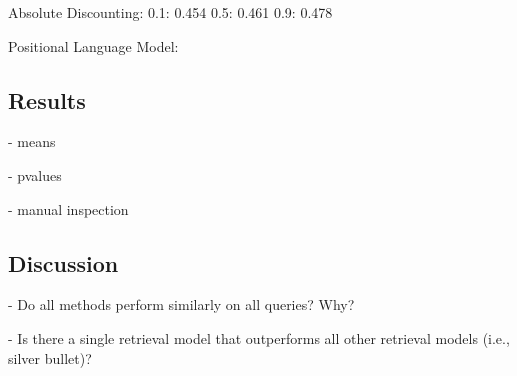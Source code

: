 Absolute Discounting:
0.1: 0.454
0.5: 0.461
0.9: 0.478

Positional Language Model:




\subsection{Results}

- means



- pvalues

- manual inspection

\subsection{Discussion}

- Do all methods perform similarly on all queries? Why?

- Is there a single retrieval model that outperforms all other retrieval models (i.e., silver bullet)?